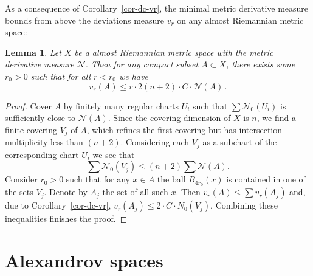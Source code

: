 \documentclass[12pt,leqno,intlimits]{amsart}
\numberwithin{equation}{section}
\newtheorem{lem}[thm]{Lemma}
\theoremstyle{definition}
\theoremstyle{remark}
\newcommand{\cref}[1]{Corollary~\ref{#1}}
\begin{document}
As a consequence of \cref{cor-dc-vr}, the minimal metric derivative measure bounds from above the deviations measure $v_r$
on any almost Riemannian metric space:

\begin{lem} \label{cor-mu-dc}
Let $X$ be a almost Riemannian metric space with the metric derivative measure $\mathcal N$.
Then for any compact subset $A\subset X$, there exists some $r_0>0$ such that for all
$r<r_0$ we have $$v_r (A) \leq r\cdot 2 (n+2)\cdot C\cdot \mathcal N (A)\,. $$
\end{lem}

\begin{proof}
Cover $A$ by finitely many regular charts $U_i$ such that $\sum \mathcal N_0 (U_i)$ is sufficiently close to $\mathcal N (A)$.
Since the covering dimension of $X$ is $n$, we find a finite covering $V_j$ of $A$, which refines the first covering but has intersection multiplicity less than $(n+2)$. Considering each $V_j$ as a subchart of the corresponding chart $U_i$ we see that
$$\sum \mathcal N_0 (V_j) \leq (n+2) \sum \mathcal N(A)  .$$
Consider $r_0>0$ such that for any $x\in A$ the ball $B_{4r_0} (x)$ is contained in one of the sets $V_j$. Denote by $A_j$ the set of all such $x$.
Then $v_r (A) \leq \sum v_r (A_j)$ and, due to \cref{cor-dc-vr}, $v_r (A_j) \leq 2 \cdot C\cdot N_0 (V_j)$.
Combining these inequalities finishes the proof.
\end{proof}

\section{Alexandrov spaces} \label{sec:Alex}
\end{document}
